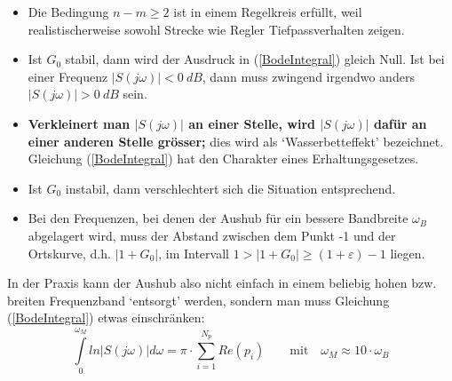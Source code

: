\begin{itemize}
	\item Die Bedingung $n-m \geq 2$ ist in einem Regelkreis erfüllt, weil realistischerweise
	sowohl Strecke wie Regler Tiefpassverhalten zeigen.
	\item Ist $G_0$ stabil, dann wird der Ausdruck in (\ref{BodeIntegral}) gleich Null. Ist bei einer Frequenz
	$|S(j\omega)| < 0 \ dB$, dann muss zwingend irgendwo anders $|S(j\omega)| > 0 \ dB$ sein.
	\item \textbf{Verkleinert man $|S(j\omega)|$ an einer Stelle, wird $|S(j\omega)|$ dafür an einer anderen
	Stelle grösser;} dies wird als ‘Wasserbetteffekt’ bezeichnet.
	Gleichung (\ref{BodeIntegral}) hat den Charakter eines Erhaltungsgesetzes.
	\item Ist $G_0$ instabil, dann verschlechtert sich die Situation entsprechend.
	\item Bei den Frequenzen, bei denen
	der Aushub für ein bessere Bandbreite $\omega_B$ abgelagert wird, muss der Abstand zwischen dem Punkt -1 und der
	Ortskurve, d.h. $|1 + G_0|$, im Intervall $1 > |1 + G_0| \geq (1 + \varepsilon)-1$ liegen.
\end{itemize}

In der Praxis kann der Aushub also nicht einfach in einem beliebig hohen bzw.
breiten Frequenzband ‘entsorgt’ werden, sondern man muss Gleichung (\ref{BodeIntegral}) etwas
einschränken:
\begin{equation}
\int\limits_{0}^{\omega_M}ln|S(j\omega)|d\omega =\pi\cdot\sum\limits_{i=1}^{N_{p}}Re(p_i) \qquad \text{mit} \quad \omega_M \approx 10 \cdot \omega_B
\end{equation}